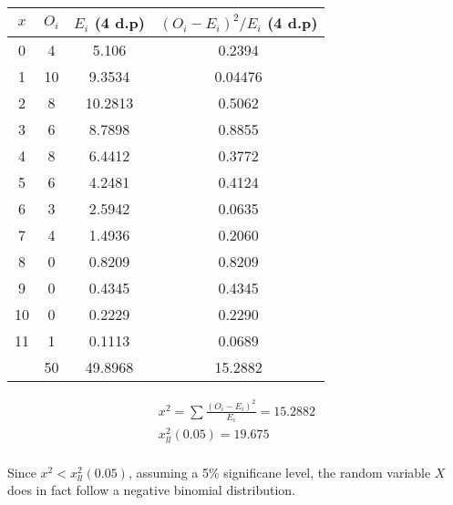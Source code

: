 \documentclass{article}
\begin{document}
\begin{center}
  \begin{tabular}{|c|c|c|c|}
    \hline
    $x$ & $O_i$ & $ E_i $ (4 d.p) & $ (O_i - E_i)^2 / E_i $ (4 d.p) \\
    \hline 
    \hline 
    0  & 4  & 5.106   & 0.2394 \\
    1  & 10 & 9.3534  & 0.04476 \\
    2  & 8  & 10.2813 & 0.5062 \\
    3  & 6  & 8.7898  & 0.8855 \\
    4  & 8  & 6.4412  & 0.3772 \\
    5  & 6  & 4.2481  & 0.4124 \\
    6  & 3  & 2.5942  & 0.0635 \\
    7  & 4  & 1.4936  & 0.2060 \\
    8  & 0  & 0.8209  & 0.8209 \\
    9  & 0  & 0.4345  & 0.4345 \\
    10 & 0  & 0.2229  & 0.2290 \\
    11 & 1  & 0.1113  & 0.0689 \\
    \hline
    \hline
       & 50 & 49.8968 & 15.2882  \\
    \hline
  \end{tabular}
\end{center}

\begin{gather*}
  x^2 = \sum \frac{(O_i - E_i)^2}{E_i} = 15.2882 \\[5pt]
  x^2_{ll} (0.05) = 19.675 \\[5pt]
\end{gather*}

Since $ x^2 < x^2_{ll}(0.05) $, assuming a 5\% significane level,
the random variable $ X $ does in fact follow a negative binomial
distribution.
\end{document}
